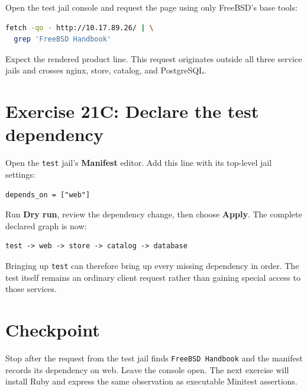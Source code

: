 Open the test jail console and request the page using only FreeBSD's base
tools:

\begin{lstlisting}[language=sh]
fetch -qo - http://10.17.89.26/ | \
  grep 'FreeBSD Handbook'
\end{lstlisting}

Expect the rendered product line. This request originates outside all three
service jails and crosses nginx, store, catalog, and PostgreSQL.

\section{Exercise 21C: Declare the test dependency}

Open the \texttt{test} jail's \textbf{Manifest} editor. Add this line with its
top-level jail settings:

\begin{lstlisting}
depends_on = ["web"]
\end{lstlisting}

Run \textbf{Dry run}, review the dependency change, then choose
\textbf{Apply}. The complete declared graph is now:

\begin{lstlisting}
test -> web -> store -> catalog -> database
\end{lstlisting}

Bringing up \texttt{test} can therefore bring up every missing dependency in
order. The test itself remains an ordinary client request rather than gaining
special access to those services.

\section{Checkpoint}

Stop after the request from the test jail finds \texttt{FreeBSD Handbook} and
the manifest records its dependency on web. Leave the console open. The next
exercise will install Ruby and express the same observation as executable
Minitest assertions.
